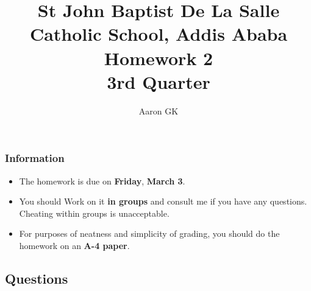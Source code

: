 \documentclass[9pt,addpoints]{exam}
\author{Aaron GK}
\begin{document}
	\title{St John Baptist De La Salle Catholic School, Addis Ababa\\
		\large Homework 2 \\
		3rd Quarter}
	\maketitle
	\begin{center}
		\subsubsection*{Information}
		\begin{itemize}
			\item The homework is due on \textbf{Friday}, \textbf{March 3}.
			\item You should Work on it \textbf{in groups} and consult me if you have any questions. Cheating within groups is unacceptable.
			\item For purposes of neatness and simplicity of grading, you should do the homework on an \textbf{A-4 paper}.
		\end{itemize}
	\end{center}
	\begin{center}
		\subsection*{Questions}
	\end{center}
\end{document}
